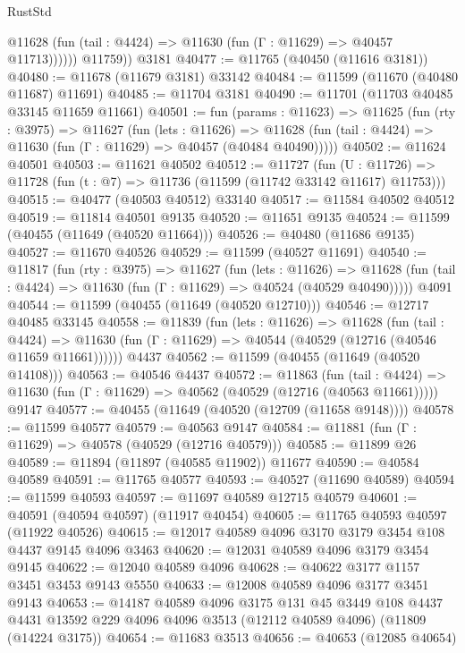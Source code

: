 \begin{lexlean}{RustStd}
\begin{coremodule}
              @11628 (fun (tail : @4424) => @11630 (fun (Γ : @11629) => @40457 @11713))))))
        @11759))
    @3181
@40477 := @11765 (@40450 (@11616 @3181))
@40480 := @11678 (@11679 @3181) @33142
@40484 := @11599 (@11670 (@40480 @11687) @11691)
@40485 := @11704 @3181
@40490 := @11701 (@11703 @40485 @33145 @11659 @11661)
@40501 := fun (params : @11623) =>
  @11625
    (fun (rty : @3975) =>
    @11627
      (fun (lets : @11626) =>
      @11628 (fun (tail : @4424) => @11630 (fun (Γ : @11629) => @40457 (@40484 @40490)))))
@40502 := @11624 @40501
@40503 := @11621 @40502
@40512 := @11727
    (fun (U : @11726) => @11728 (fun (t : @7) => @11736 (@11599 (@11742 @33142 @11617) @11753)))
@40515 := @40477 (@40503 @40512) @33140
@40517 := @11584 @40502 @40512
@40519 := @11814 @40501 @9135
@40520 := @11651 @9135
@40524 := @11599 (@40455 (@11649 (@40520 @11664)))
@40526 := @40480 (@11686 @9135)
@40527 := @11670 @40526
@40529 := @11599 (@40527 @11691)
@40540 := @11817
    (fun (rty : @3975) =>
    @11627
      (fun (lets : @11626) =>
      @11628 (fun (tail : @4424) => @11630 (fun (Γ : @11629) => @40524 (@40529 @40490)))))
    @4091
@40544 := @11599 (@40455 (@11649 (@40520 @12710)))
@40546 := @12717 @40485 @33145
@40558 := @11839
    (fun (lets : @11626) =>
    @11628
      (fun (tail : @4424) =>
      @11630 (fun (Γ : @11629) => @40544 (@40529 (@12716 (@40546 @11659 @11661))))))
    @4437
@40562 := @11599 (@40455 (@11649 (@40520 @14108)))
@40563 := @40546 @4437
@40572 := @11863
    (fun (tail : @4424) => @11630 (fun (Γ : @11629) => @40562 (@40529 (@12716 (@40563 @11661)))))
    @9147
@40577 := @40455 (@11649 (@40520 (@12709 (@11658 @9148))))
@40578 := @11599 @40577
@40579 := @40563 @9147
@40584 := @11881 (fun (Γ : @11629) => @40578 (@40529 (@12716 @40579)))
@40585 := @11899 @26
@40589 := @11894 (@11897 (@40585 @11902)) @11677
@40590 := @40584 @40589
@40591 := @11765 @40577
@40593 := @40527 (@11690 @40589)
@40594 := @11599 @40593
@40597 := @11697 @40589 @12715 @40579
@40601 := @40591 (@40594 @40597) (@11917 @40454)
@40605 := @11765 @40593 @40597 (@11922 @40526)
@40615 := @12017 @40589 @4096 @3170 @3179 @3454 @108 @4437 @9145 @4096 @3463
@40620 := @12031 @40589 @4096 @3179 @3454 @9145
@40622 := @12040 @40589 @4096
@40628 := @40622 @3177 @1157 @3451 @3453 @9143 @5550
@40633 := @12008 @40589 @4096 @3177 @3451 @9143
@40653 := @14187
    @40589
    @4096
    @3175
    @131
    @45
    @3449
    @108
    @4437
    @4431
    @13592
    @229
    @4096
    @4096
    @3513
    (@12112 @40589 @4096)
    (@11809 (@14224 @3175))
@40654 := @11683 @3513
@40656 := @40653 (@12085 @40654)

\end{coremodule}
\end{lexlean}

